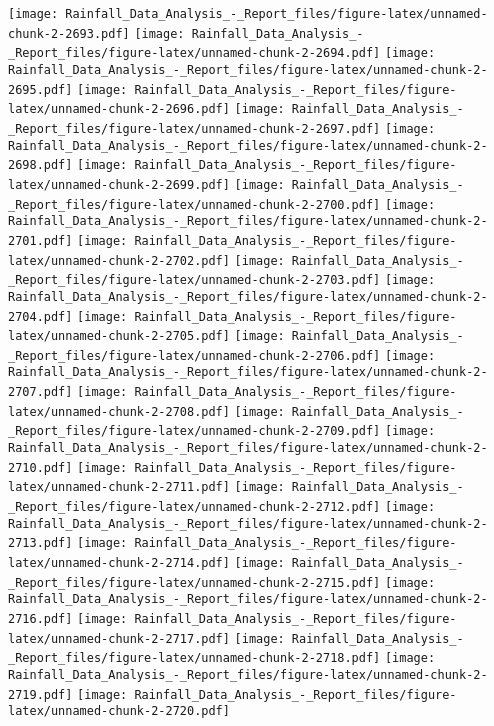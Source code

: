 \documentclass[
]{article}
\begin{document}
\texttt{[image: Rainfall\_Data\_Analysis\_-\_Report\_files/figure-latex/unnamed-chunk-2-2693.pdf]}
\texttt{[image: Rainfall\_Data\_Analysis\_-\_Report\_files/figure-latex/unnamed-chunk-2-2694.pdf]}
\texttt{[image: Rainfall\_Data\_Analysis\_-\_Report\_files/figure-latex/unnamed-chunk-2-2695.pdf]}
\texttt{[image: Rainfall\_Data\_Analysis\_-\_Report\_files/figure-latex/unnamed-chunk-2-2696.pdf]}
\texttt{[image: Rainfall\_Data\_Analysis\_-\_Report\_files/figure-latex/unnamed-chunk-2-2697.pdf]}
\texttt{[image: Rainfall\_Data\_Analysis\_-\_Report\_files/figure-latex/unnamed-chunk-2-2698.pdf]}
\texttt{[image: Rainfall\_Data\_Analysis\_-\_Report\_files/figure-latex/unnamed-chunk-2-2699.pdf]}
\texttt{[image: Rainfall\_Data\_Analysis\_-\_Report\_files/figure-latex/unnamed-chunk-2-2700.pdf]}
\texttt{[image: Rainfall\_Data\_Analysis\_-\_Report\_files/figure-latex/unnamed-chunk-2-2701.pdf]}
\texttt{[image: Rainfall\_Data\_Analysis\_-\_Report\_files/figure-latex/unnamed-chunk-2-2702.pdf]}
\texttt{[image: Rainfall\_Data\_Analysis\_-\_Report\_files/figure-latex/unnamed-chunk-2-2703.pdf]}
\texttt{[image: Rainfall\_Data\_Analysis\_-\_Report\_files/figure-latex/unnamed-chunk-2-2704.pdf]}
\texttt{[image: Rainfall\_Data\_Analysis\_-\_Report\_files/figure-latex/unnamed-chunk-2-2705.pdf]}
\texttt{[image: Rainfall\_Data\_Analysis\_-\_Report\_files/figure-latex/unnamed-chunk-2-2706.pdf]}
\texttt{[image: Rainfall\_Data\_Analysis\_-\_Report\_files/figure-latex/unnamed-chunk-2-2707.pdf]}
\texttt{[image: Rainfall\_Data\_Analysis\_-\_Report\_files/figure-latex/unnamed-chunk-2-2708.pdf]}
\texttt{[image: Rainfall\_Data\_Analysis\_-\_Report\_files/figure-latex/unnamed-chunk-2-2709.pdf]}
\texttt{[image: Rainfall\_Data\_Analysis\_-\_Report\_files/figure-latex/unnamed-chunk-2-2710.pdf]}
\texttt{[image: Rainfall\_Data\_Analysis\_-\_Report\_files/figure-latex/unnamed-chunk-2-2711.pdf]}
\texttt{[image: Rainfall\_Data\_Analysis\_-\_Report\_files/figure-latex/unnamed-chunk-2-2712.pdf]}
\texttt{[image: Rainfall\_Data\_Analysis\_-\_Report\_files/figure-latex/unnamed-chunk-2-2713.pdf]}
\texttt{[image: Rainfall\_Data\_Analysis\_-\_Report\_files/figure-latex/unnamed-chunk-2-2714.pdf]}
\texttt{[image: Rainfall\_Data\_Analysis\_-\_Report\_files/figure-latex/unnamed-chunk-2-2715.pdf]}
\texttt{[image: Rainfall\_Data\_Analysis\_-\_Report\_files/figure-latex/unnamed-chunk-2-2716.pdf]}
\texttt{[image: Rainfall\_Data\_Analysis\_-\_Report\_files/figure-latex/unnamed-chunk-2-2717.pdf]}
\texttt{[image: Rainfall\_Data\_Analysis\_-\_Report\_files/figure-latex/unnamed-chunk-2-2718.pdf]}
\texttt{[image: Rainfall\_Data\_Analysis\_-\_Report\_files/figure-latex/unnamed-chunk-2-2719.pdf]}
\texttt{[image: Rainfall\_Data\_Analysis\_-\_Report\_files/figure-latex/unnamed-chunk-2-2720.pdf]}
\end{document}

